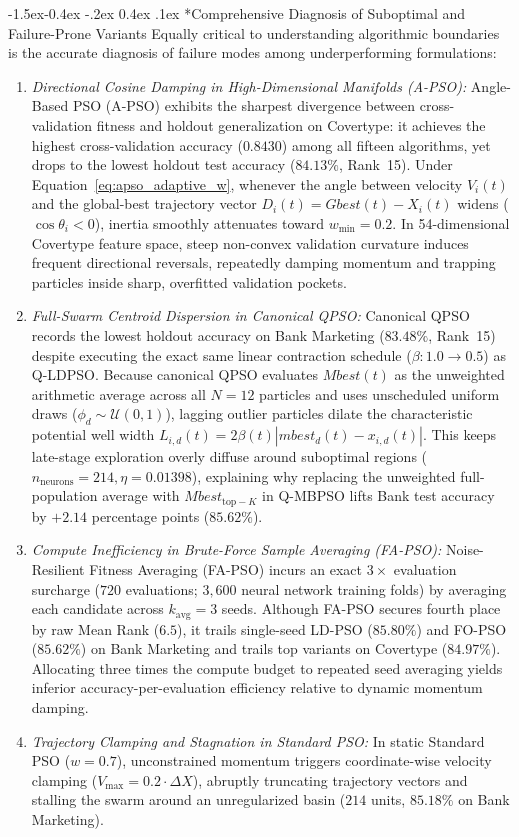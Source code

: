 \documentclass[10pt]{article}
\makeatletter
\renewcommand\subsubsection{\@startsection{subsubsection}{3}{\z@}%
                                     {-1.5ex\@plus -0.4ex \@minus -.2ex}%
                                     {0.4ex \@plus .1ex}%
                                     {\normalfont\itshape\fontsize{7.8pt}{10.0pt}\selectfont}}
\makeatother
\begin{document}
\subsubsection*{Comprehensive Diagnosis of Suboptimal and Failure-Prone Variants}
Equally critical to understanding algorithmic boundaries is the accurate diagnosis of failure modes among underperforming formulations:
\begin{enumerate}
    \item \textit{Directional Cosine Damping in High-Dimensional Manifolds (A-PSO):} Angle-Based PSO (A-PSO) exhibits the sharpest divergence between cross-validation fitness and holdout generalization on Covertype: it achieves the highest cross-validation accuracy ($0.8430$) among all fifteen algorithms, yet drops to the lowest holdout test accuracy ($84.13\%$, Rank~15). Under Equation~\eqref{eq:apso_adaptive_w}, whenever the angle between velocity $V_i(t)$ and the global-best trajectory vector $D_i(t) = Gbest(t) - X_i(t)$ widens ($\cos\theta_i < 0$), inertia smoothly attenuates toward $w_{\min} = 0.2$. In 54-dimensional Covertype feature space, steep non-convex validation curvature induces frequent directional reversals, repeatedly damping momentum and trapping particles inside sharp, overfitted validation pockets.
    \item \textit{Full-Swarm Centroid Dispersion in Canonical QPSO:} Canonical QPSO records the lowest holdout accuracy on Bank Marketing ($83.48\%$, Rank~15) despite executing the exact same linear contraction schedule ($\beta: 1.0 \to 0.5$) as Q-LDPSO. Because canonical QPSO evaluates $Mbest(t)$ as the unweighted arithmetic average across all $N=12$ particles and uses unscheduled uniform draws ($\phi_d \sim \mathcal{U}(0,1)$), lagging outlier particles dilate the characteristic potential well width $L_{i,d}(t) = 2\beta(t)|mbest_d(t) - x_{i,d}(t)|$. This keeps late-stage exploration overly diffuse around suboptimal regions ($n_{\mathrm{neurons}}=214, \eta=0.01398$), explaining why replacing the unweighted full-population average with $Mbest_{\mathrm{top-}K}$ in Q-MBPSO lifts Bank test accuracy by $+2.14$ percentage points ($85.62\%$).
    \item \textit{Compute Inefficiency in Brute-Force Sample Averaging (FA-PSO):} Noise-Resilient Fitness Averaging (FA-PSO) incurs an exact $3\times$ evaluation surcharge ($720$ evaluations; $3{,}600$ neural network training folds) by averaging each candidate across $k_{\mathrm{avg}}=3$ seeds. Although FA-PSO secures fourth place by raw Mean Rank ($6.5$), it trails single-seed LD-PSO ($85.80\%$) and FO-PSO ($85.62\%$) on Bank Marketing and trails top variants on Covertype ($84.97\%$). Allocating three times the compute budget to repeated seed averaging yields inferior accuracy-per-evaluation efficiency relative to dynamic momentum damping.
    \item \textit{Trajectory Clamping and Stagnation in Standard PSO:} In static Standard PSO ($w=0.7$), unconstrained momentum triggers coordinate-wise velocity clamping ($V_{\max} = 0.2 \cdot \Delta X$), abruptly truncating trajectory vectors and stalling the swarm around an unregularized basin ($214$ units, $85.18\%$ on Bank Marketing).
\end{enumerate}
\end{document}
